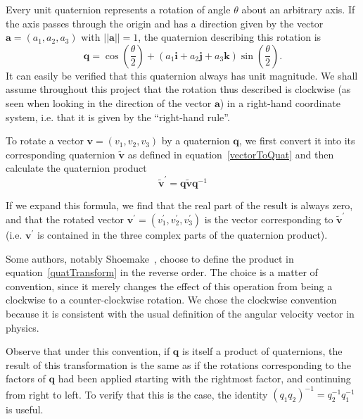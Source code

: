 Every unit quaternion represents a rotation of angle $\theta$ about an arbitrary axis.
If the axis passes through the origin and has a direction given by the vector
$\mathbf{a} = (a_1, a_2, a_3)$ with $||\mathbf{a}|| = 1$, the quaternion describing this rotation is
\begin{equation}
\label{quatRotation}
\mathbf{q} = \cos\left(\frac{\theta}{2}\right) + (a_1\mathbf{i} + a_2\mathbf{j} +
    a_3\mathbf{k}) \sin\left(\frac{\theta}{2}\right).
\end{equation}
It can easily be verified that this quaternion always has unit magnitude.
We shall assume throughout this project that the rotation thus described is clockwise (as seen
when looking in the direction of the vector $\mathbf{a}$) in a right-hand coordinate system,
i.e. that it is given by the ``right-hand rule''.

To rotate a vector $\mathbf{v} = (v_1, v_2, v_3)$ by a quaternion $\mathbf{q}$, we first
convert it into its corresponding quaternion $\tilde{\mathbf{v}}$ as defined in
equation~\ref{vectorToQuat} and then calculate the quaternion product
\begin{equation}
\label{quatTransform}
\tilde{\mathbf{v}}^\prime = \mathbf{q}\tilde{\mathbf{v}}\mathbf{q}^{-1}
\end{equation}

If we expand this formula, we find that the real part of the result is always zero, and
that the rotated vector $\mathbf{v}^\prime = (v_1^\prime, v_2^\prime, v_3^\prime)$ is
the vector corresponding to $\tilde{\mathbf{v}}^\prime$ (i.e. $\mathbf{v}^\prime$ is
contained in the three complex parts of the quaternion product).

Some authors, notably Shoemake~\cite{Shoemake:85}, choose to define the product in
equation~\ref{quatTransform} in
the reverse order. The choice is a matter of convention, since it merely changes the effect
of this operation from being a clockwise to a counter-clockwise rotation. We chose the clockwise
convention because it is consistent with the usual definition of the angular velocity vector
in physics.

Observe that under this convention, if $\mathbf{q}$ is itself a product of quaternions, the
result of this transformation is the same as if the rotations corresponding to the factors
of $\mathbf{q}$ had been applied starting with the rightmost factor, and continuing from
right to left. To verify that this is the case, the identity
$(q_1 q_2)^{-1} = q_2^{-1} q_1^{-1}$ is useful.

